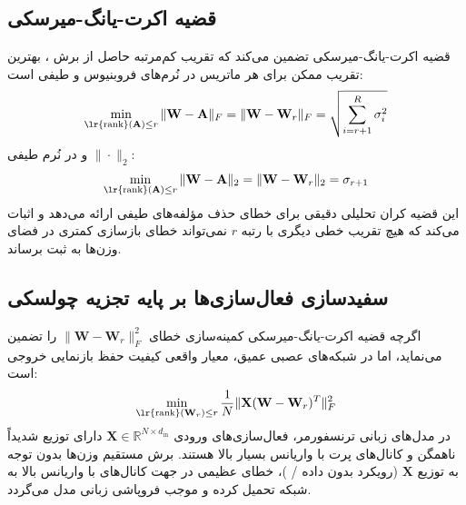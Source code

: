 \documentclass[12pt,a4paper]{report}
\theoremstyle{definition}
\begin{document}
\subsection{قضیه اکرت-یانگ-میرسکی }
قضیه اکرت-یانگ-میرسکی \cite{eckart1936approximation} تضمین می‌کند که تقریب کم‌مرتبه حاصل از برش ، بهترین تقریب ممکن برای هر ماتریس در نُرم‌های فروبنیوس و طیفی است:
\begin{equation}
\min_{\text{\lr{rank}}(\mathbf{A}) \le r} \|\mathbf{W} - \mathbf{A}\|_F = \|\mathbf{W} - \mathbf{W}_r\|_F = \sqrt{\sum_{i=r+1}^R \sigma_i^2}
\end{equation}
و در نُرم طیفی $\|\cdot\|_2$:
\begin{equation}
\min_{\text{\lr{rank}}(\mathbf{A}) \le r} \|\mathbf{W} - \mathbf{A}\|_2 = \|\mathbf{W} - \mathbf{W}_r\|_2 = \sigma_{r+1}
\end{equation}
این قضیه کران تحلیلی دقیقی برای خطای حذف مؤلفه‌های طیفی ارائه می‌دهد و اثبات می‌کند که هیچ تقریب خطی دیگری با رتبه $r$ نمی‌تواند خطای بازسازی کمتری در فضای وزن‌ها به ثبت برساند.

\subsection{سفیدسازی فعال‌سازی‌ها بر پایه تجزیه چولسکی }
\label{sec:cholesky_whitening}
اگرچه قضیه اکرت-یانگ-میرسکی کمینه‌سازی خطای $\| \mathbf{W} - \mathbf{W}_r \|_F^2$ را تضمین می‌نماید، اما در شبکه‌های عصبی عمیق، معیار واقعی کیفیت حفظ بازنمایی خروجی است:
\begin{equation}
\min_{\text{\lr{rank}}(\mathbf{W}_r) \le r} \frac{1}{N} \| \mathbf{X}(\mathbf{W} - \mathbf{W}_r)^T \|_F^2
\end{equation}
در مدل‌های زبانی ترنسفورمر، فعال‌سازی‌های ورودی $\mathbf{X} \in \mathbb{R}^{N \times d_{\text{in}}}$ دارای توزیع شدیداً ناهمگن و کانال‌های پرت با واریانس بسیار بالا  هستند. برش مستقیم  وزن‌ها بدون توجه به توزیع $\mathbf{X}$ (رویکرد بدون داده / )، خطای عظیمی در جهت کانال‌های با واریانس بالا به شبکه تحمیل کرده و موجب فروپاشی زبانی مدل می‌گردد.
\end{document}
